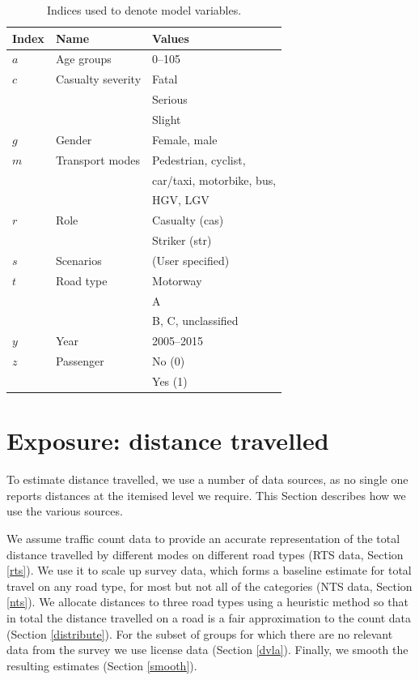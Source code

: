 \documentclass{article}
\begin{document}
\begin{table}[ht]
\begin{center}
\caption{Indices used to denote model variables.}
\begin{tabular}{lll}
\label{indices}
Index & Name & Values \\
\hline
$a$ & Age groups & 0--105\\
$c$ & Casualty severity & Fatal \\
& & Serious \\
& & Slight \\
$g$ & Gender & Female, male \\
$m$ & Transport modes& Pedestrian, cyclist,\\
& & car/taxi, motorbike, bus, \\
& & HGV, LGV \\
$r$& Role & Casualty (cas) \\
& & Striker (str) \\
$s$ & Scenarios & (User specified)\\
$t$ & Road type & Motorway \\
& & A \\
& & B, C, unclassified \\
$y$ & Year & 2005--2015\\
$z$ & Passenger& No (0) \\
& & Yes (1) \\
\hline
\end{tabular}
\end{center}
\end{table}


\section{Exposure: distance travelled}\label{exp}

To estimate distance travelled, we use a number of data sources, as no single one reports distances at the itemised level we require. This Section describes how we use the various sources. 

We assume traffic count data to provide an accurate representation of the total distance travelled by different modes on different road types (RTS data, Section \ref{rts}). We use it to scale up survey data, which forms a baseline estimate for total travel on any road type, for most but not all of the categories (NTS data, Section \ref{nts}). We allocate distances to three road types using a heuristic method so that in total the distance travelled on a road is a fair approximation to the count data (Section \ref{distribute}). For the subset of groups for which there are no relevant data from the survey we use license data (Section \ref{dvla}). Finally, we smooth the resulting estimates (Section \ref{smooth}).
\end{document}
